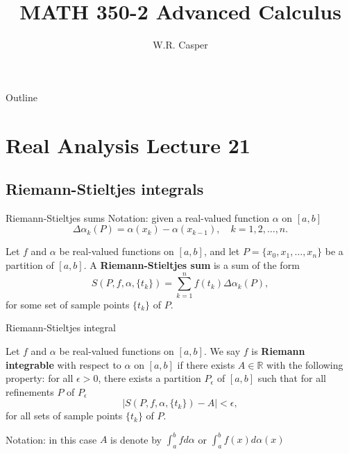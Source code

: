 \documentclass{beamer}
\title{MATH 350-2 Advanced Calculus}
\subtitle
{} %
\author[W.R. Casper] %
{W.R. Casper}
\institute[California State University Fullerton] %
{
  Department of Mathematics\\
  California State University Fullerton}
\begin{document}
\begin{frame}
  \titlepage
\end{frame}

\begin{frame}{Outline}
  \tableofcontents
\end{frame}



\section{Real Analysis Lecture 21}

\subsection{Riemann-Stieltjes integrals}

\begin{frame}{Riemann-Stieltjes sums}
Notation: given a real-valued function $\alpha$ on $[a,b]$\\
$$\Delta \alpha_k(P) = \alpha(x_k)-\alpha(x_{k-1}),\quad k=1,2,\dots,n.$$
\pause
\begin{defn}
\pause
Let $f$ and $\alpha$ be real-valued functions on $[a,b]$, and let $P = \{x_0,x_1,\dots,x_n\}$ be a partition of $[a,b]$.
\pause
A \textbf{Riemann-Stieltjes sum} is a sum of the form
$$S(P,f,\alpha,\{t_k\}) = \sum_{k=1}^n f(t_k) \Delta\alpha_k(P),$$
for some set of sample points $\{t_k\}$ of $P$.
\end{defn}
\end{frame}

\begin{frame}{Riemann-Stieltjes integral}
\begin{defn}
\pause
Let $f$ and $\alpha$ be real-valued functions on $[a,b]$.
\pause
We say $f$ is \textbf{Riemann integrable} with respect to $\alpha$ on $[a,b]$ if there exists $A\in\mathbb{R}$ with the following property:
\pause 
for all $\epsilon > 0$, there exists a partition $P_\epsilon$ of $[a,b]$ such that for all refinements $P$ of $P_\epsilon$
$$|S(P,f,\alpha,\{t_k\}) - A| < \epsilon,$$
for all sets of sample points $\{t_k\}$ of $P$.
\end{defn}
\pause
Notation: in this case $A$ is denote by $\int_a^b f d\alpha$ or $\int_a^b f(x) d\alpha(x)$
\end{frame}
\end{document}
